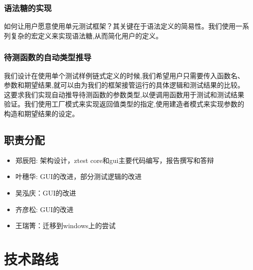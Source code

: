 \documentclass{article}
\begin{document}
\subsubsection{语法糖的实现}
如何让用户愿意使用单元测试框架？其关键在于语法定义的简易性。我们使用一系列复杂的宏定义来实现语法糖,从而简化用户的定义。
\subsubsection{待测函数的自动类型推导}
我们设计在使用单个测试样例链式定义的时候,我们希望用户只需要传入函数名、参数和期望结果,就可以由为我们的框架接管运行的具体逻辑和测试结果的比较。
这要求我们实现自动推导待测函数的参数类型,以便调用函数用于测试和测试结果验证。我们使用工厂模式来实现返回值类型的指定,使用建造者模式来实现参数的构造和期望结果的设定。
\subsection{ 职责分配}
\begin{itemize}[leftmargin=*]
    \item 郑辰阳: 架构设计，ztest core和gui主要代码编写，报告撰写和答辩
    \item 叶穗华: GUI的改进，部分测试逻辑的改进
    \item 吴泓庆：GUI的改进
    \item 齐彦松: GUI的改进
    \item 王瑞箐：迁移到windows上的尝试
\end{itemize}

\section{技术路线}
\end{document}
